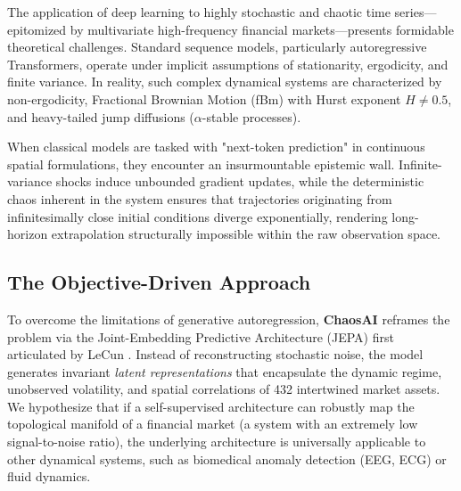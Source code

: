 \documentclass[11pt]{article}
\begin{document}
The application of deep learning to highly stochastic and chaotic time series—epitomized by multivariate high-frequency financial markets—presents formidable theoretical challenges. Standard sequence models, particularly autoregressive Transformers, operate under implicit assumptions of stationarity, ergodicity, and finite variance. In reality, such complex dynamical systems are characterized by non-ergodicity, Fractional Brownian Motion (fBm) with Hurst exponent $H \neq 0.5$, and heavy-tailed jump diffusions ($\alpha$-stable processes). 

When classical models are tasked with "next-token prediction" in continuous spatial formulations, they encounter an insurmountable epistemic wall. Infinite-variance shocks induce unbounded gradient updates, while the deterministic chaos inherent in the system ensures that trajectories originating from infinitesimally close initial conditions diverge exponentially, rendering long-horizon extrapolation structurally impossible within the raw observation space. 

\subsection{The Objective-Driven Approach}
To overcome the limitations of generative autoregression, \textbf{ChaosAI} reframes the problem via the Joint-Embedding Predictive Architecture (JEPA) first articulated by LeCun \cite{lecun2022}. Instead of reconstructing stochastic noise, the model generates invariant \textit{latent representations} that encapsulate the dynamic regime, unobserved volatility, and spatial correlations of 432 intertwined market assets. We hypothesize that if a self-supervised architecture can robustly map the topological manifold of a financial market (a system with an extremely low signal-to-noise ratio), the underlying architecture is universally applicable to other dynamical systems, such as biomedical anomaly detection (EEG, ECG) or fluid dynamics.
\end{document}
